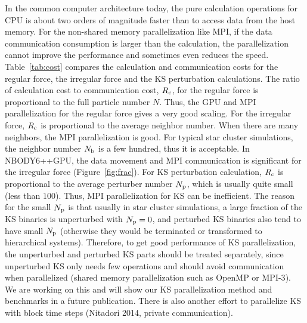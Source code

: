 \documentclass[usenatbib,aas_macros]{mn2e}
\begin{document}

In the common computer architecture today, the pure calculation operations for CPU is about two orders of magnitude faster than to access data from the host memory.
For the non-shared memory parallelization like MPI, if the data communication consumption is larger than the calculation, 
the parallelization cannot improve the performance and sometimes even reduces the speed. 
Table~\ref{tab:cost} compares the calculation and communication costs for the regular force, the irregular force and the KS perturbation calculations. 
The ratio of calculation cost to communication cost, $R_{\rm c}$, for the regular force is proportional to the full particle number $N$. 
Thus, the GPU and MPI parallelization for the regular force gives a very good scaling. 
For the irregular force, $R_{\rm c}$ is proportional to the average neighbor number. 
When there are many neighbors, the MPI parallelization is good. 
For typical star cluster simulations, the neighbor number $N_{\rm b}$ is a few hundred, thus it is acceptable. 
In NBODY6++GPU, the data movement and MPI communication is significant for the irregular force (Figure~\ref{fig:frac}). 
For KS perturbation calculation, $R_{\rm c}$ is proportional to the average perturber number $N_{\rm p}$, which is usually quite small (less than $100$).
Thus, MPI parallelization for KS can be inefficient. 
The reason for the small $N_{\rm p}$ is that usually in star cluster simulations, a large fraction of the KS binaries is unperturbed with $N_{\rm p} = 0$, and perturbed KS binaries also tend to have small $N_{\rm p}$ (otherwise they would be terminated or transformed to hierarchical systems). 
Therefore, to get good performance of KS parallelization, the unperturbed and perturbed KS parts should be treated separately, since unperturbed KS only needs few operations and should avoid communication when parallelized (shared memory parallelization such as OpenMP or {\protect MPI-3}).
We are working on this and will show our KS parallelization method and benchmarks in a future publication. 
There is also another effort to parallelize KS with block time steps (Nitadori 2014, private communication).
\end{document}
